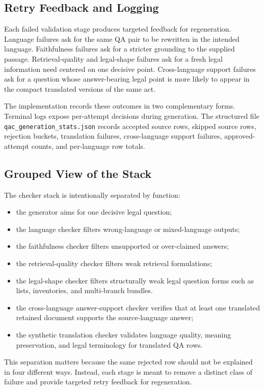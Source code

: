\subsection{Retry Feedback and Logging}

Each failed validation stage produces targeted feedback for regeneration. Language failures ask for the same QA pair to be rewritten in the intended language. Faithfulness failures ask for a stricter grounding to the supplied passage. Retrieval-quality and legal-shape failures ask for a fresh legal information need centered on one decisive point. Cross-language support failures ask for a question whose answer-bearing legal point is more likely to appear in the compact translated versions of the same act.

The implementation records these outcomes in two complementary forms. Terminal logs expose per-attempt decisions during generation. The structured file \texttt{qac\_generation\_stats.json} records accepted source rows, skipped source rows, rejection buckets, translation failures, cross-language support failures, approved-attempt counts, and per-language row totals.

\subsection{Grouped View of the Stack}

The checker stack is intentionally separated by function:
\begin{itemize}
\item the generator aims for one decisive legal question;
\item the language checker filters wrong-language or mixed-language outputs;
\item the faithfulness checker filters unsupported or over-claimed answers;
\item the retrieval-quality checker filters weak retrieval formulations;
\item the legal-shape checker filters structurally weak legal question forms such as lists, inventories, and multi-branch bundles.
\item the cross-language answer-support checker verifies that at least one translated retained document supports the source-language answer;
\item the synthetic translation checker validates language quality, meaning preservation, and legal terminology for translated QA rows.
\end{itemize}

This separation matters because the same rejected row should not be explained in four different ways. Instead, each stage is meant to remove a distinct class of failure and provide targeted retry feedback for regeneration.
